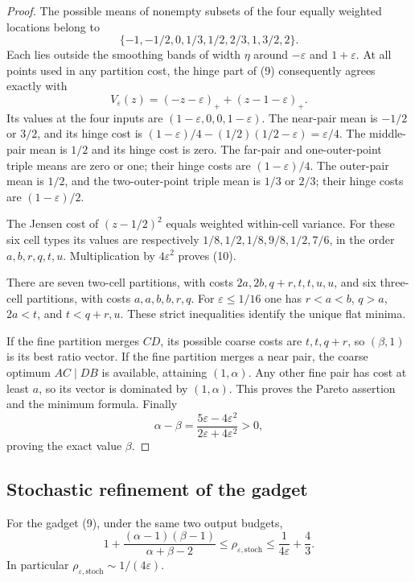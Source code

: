 \begin{proof}
The possible means of nonempty subsets of the four equally weighted
locations belong to
\[
 \{-1,-1/2,0,1/3,1/2,2/3,1,3/2,2\}.
\]
Each lies outside the smoothing bands of width $\eta$ around
$-\varepsilon$ and $1+\varepsilon$.  At all points used in any
partition cost, the hinge part of (9) consequently agrees exactly with
\[
 V_\varepsilon(z)=(-z-\varepsilon)_+
                         +(z-1-\varepsilon)_+.
\]
Its values at the four inputs are $(1-\varepsilon,0,0,1-\varepsilon)$.
The near-pair mean is $-1/2$ or $3/2$, and its hinge cost is
$(1-\varepsilon)/4-(1/2)(1/2-\varepsilon)=\varepsilon/4$.
The middle-pair mean is $1/2$ and its hinge cost is zero.
The far-pair and one-outer-point triple means are zero or one; their
hinge costs are $(1-\varepsilon)/4$.  The outer-pair mean is $1/2$,
and the two-outer-point triple mean is $1/3$ or $2/3$; their hinge costs
are $(1-\varepsilon)/2$.

The Jensen cost of $(z-1/2)^2$ equals weighted within-cell variance.
For these six cell types its values are respectively
$1/8,1/2,1/8,9/8,1/2,7/6$, in the order $a,b,r,q,t,u$.
Multiplication by $4\varepsilon^2$ proves (10).

There are seven two-cell partitions, with costs
$2a,2b,q+r,t,t,u,u$, and six three-cell partitions, with costs
$a,a,b,b,r,q$.  For $\varepsilon\leq1/16$ one has
$r<a<b$, $q>a$, $2a<t$, and $t<q+r,u$.
These strict inequalities identify the unique flat minima.

If the fine partition merges $CD$, its possible coarse costs are
$t,t,q+r$, so $(\beta,1)$ is its best ratio vector.  If the fine
partition merges a near pair, the coarse optimum $AC\mid DB$ is
available, attaining $(1,\alpha)$.  Any other fine pair has cost
at least $a$, so its vector is dominated by $(1,\alpha)$.
This proves the Pareto assertion and the minimum formula.  Finally
\[
 \alpha-\beta
 =\frac{5\varepsilon-4\varepsilon^2}
          {2\varepsilon+4\varepsilon^2}>0,
\]
proving the exact value $\beta$.
\end{proof}

\subsection{Stochastic refinement of the gadget}

\begin{lemma}
\label{lem:equal-mass-stochastic}
For the gadget (9), under the same two output budgets,
\[
 1+\frac{(\alpha-1)(\beta-1)}{\alpha+\beta-2}
 \leq\rho_{\varepsilon,\mathrm{stoch}}
 \leq\frac1{4\varepsilon}+\frac43.
 \tag{12}\label{eq:gadget-stochastic-bracket}
\]
In particular $\rho_{\varepsilon,\mathrm{stoch}}
\sim1/(4\varepsilon)$.
\end{lemma}

